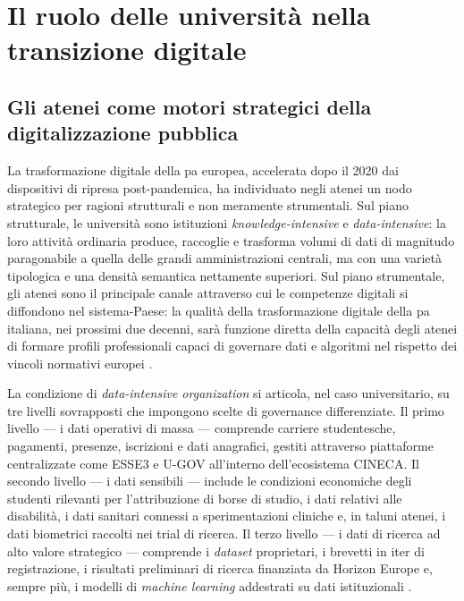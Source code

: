 \section{Il ruolo delle università nella transizione digitale}
\label{sec:universita-transizione}

\subsection{Gli atenei come motori strategici della digitalizzazione pubblica}

La trasformazione digitale della \gls{pa} europea, accelerata dopo il 2020 dai dispositivi di
ripresa post-pandemica, ha individuato negli atenei un nodo strategico per ragioni
strutturali e non meramente strumentali. Sul piano strutturale, le università sono
istituzioni \textit{knowledge-intensive} e \textit{data-intensive}: la loro attività
ordinaria produce, raccoglie e trasforma volumi di dati di magnitudo paragonabile a
quella delle grandi amministrazioni centrali, ma con una varietà tipologica e una densità
semantica nettamente superiori. Sul piano strumentale, gli atenei sono il principale
canale attraverso cui le competenze digitali si diffondono nel sistema-Paese: la
qualità della trasformazione digitale della \gls{pa} italiana, nei prossimi due decenni,
sarà funzione diretta della capacità degli atenei di formare profili professionali capaci
di governare dati e algoritmi nel rispetto dei vincoli normativi europei
\parencite{NunezCanal2026}.

La condizione di \textit{data-intensive organization} si articola, nel caso universitario,
su tre livelli sovrapposti che impongono scelte di governance differenziate. Il primo
livello --- i dati operativi di massa --- comprende carriere studentesche,
pagamenti, presenze, iscrizioni e dati anagrafici, gestiti attraverso piattaforme
centralizzate come ESSE3 e U-GOV all'interno dell'ecosistema CINECA. Il secondo livello
--- i dati sensibili --- include le condizioni economiche degli studenti
rilevanti per l'attribuzione di borse di studio, i dati relativi alle disabilità, i dati
sanitari connessi a sperimentazioni cliniche e, in taluni atenei, i dati biometrici
raccolti nei trial di ricerca. Il terzo livello --- i dati di ricerca ad alto
valore strategico --- comprende i \textit{dataset} proprietari, i brevetti in iter di
registrazione, i risultati preliminari di ricerca finanziata da Horizon Europe e,
sempre più, i modelli di \textit{machine learning} addestrati su dati istituzionali
\parencite{McNicol2024DataEthics}.

